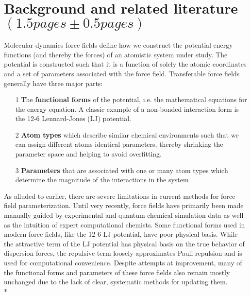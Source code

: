 \documentclass[rmp,nofootinbib,superscriptaddress,12pt,tightenlines,notitlepage]{revtex4-1}
\begin{document}
\section{Background and related literature $\left(1.5 pages \pm 0.5 pages\right)$}
Molecular dynamics force fields define how we construct the potential energy functions (and thereby the forces) of an atomistic system under study. The potential is constructed such that it is a function of solely the atomic coordinates and a set of parameters associated with the force field. Transferable force fields generally have three major parts: 
  \begin{itemize}
   \item [1] The \textbf{functional forms} of the potential, i.e. the mathematical equations for the energy equation. A classic example of a non-bonded interaction form is the 12-6 Lennard-Jones (LJ) potential.  
   \item [2] \textbf{Atom types} which describe similar chemical environments such that we can assign different atoms identical parameters, thereby shrinking the parameter space and helping to avoid overfitting.
   \item [3] \textbf{Parameters} that are associated with one or many atom types which determine the magnitude of the interactions in the system 
  \end{itemize}

As alluded to earlier, there are severe limitations in current methods for force field parameterization. Until very recently, force fields have primarily been made manually guided by experimental and quantum chemical simulation data as well as the intuition of expert computational chemists.\cite{charmm1,charmm2,mm2,mmff,amber} Some functional forms used in modern force fields, like the 12-6 LJ potential, have poor physical basis. While the attractive term of the LJ potential has physical basis on the true behavior of dispersion forces, the repulsive term loosely approximates Pauli repulsion and is used for computational convenience. Despite attempts at improvement, many of the functional forms and parameters of these force fields also remain mostly unchanged due to the lack of clear, systematic methods for updating them.\cite{unchanged}\\*
\end{document}
